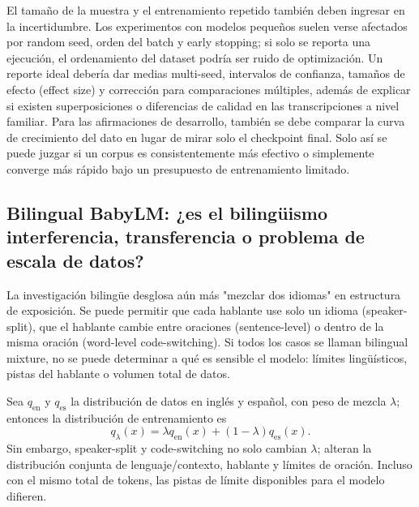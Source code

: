 El tamaño de la muestra y el entrenamiento repetido también deben ingresar en la incertidumbre. Los experimentos con modelos pequeños suelen verse afectados por random seed, orden del batch y early stopping; si solo se reporta una ejecución, el ordenamiento del dataset podría ser ruido de optimización. Un reporte ideal debería dar medias multi-seed, intervalos de confianza, tamaños de efecto (effect size) y corrección para comparaciones múltiples, además de explicar si existen superposiciones o diferencias de calidad en las transcripciones a nivel familiar. Para las afirmaciones de desarrollo, también se debe comparar la curva de crecimiento del dato en lugar de mirar solo el checkpoint final. Solo así se puede juzgar si un corpus es consistentemente más efectivo o simplemente converge más rápido bajo un presupuesto de entrenamiento limitado.

\subsection{Bilingual BabyLM: ¿es el bilingüismo interferencia, transferencia o problema de escala de datos?}

La investigación bilingüe desglosa aún más "mezclar dos idiomas" en estructura de exposición. Se puede permitir que cada hablante use solo un idioma (speaker-split), que el hablante cambie entre oraciones (sentence-level) o dentro de la misma oración (word-level code-switching). Si todos los casos se llaman bilingual mixture, no se puede determinar a qué es sensible el modelo: límites lingüísticos, pistas del hablante o volumen total de datos.



Sea $q_{\mathrm{en}}$ y $q_{\mathrm{es}}$ la distribución de datos en inglés y español, con peso de mezcla $\lambda$; entonces la distribución de entrenamiento es
\[
q_{\lambda}(x)=\lambda q_{\mathrm{en}}(x)+(1-\lambda)q_{\mathrm{es}}(x).
\]
Sin embargo, speaker-split y code-switching no solo cambian $\lambda$; alteran la distribución conjunta de lenguaje/contexto, hablante y límites de oración. Incluso con el mismo total de tokens, las pistas de límite disponibles para el modelo difieren.

